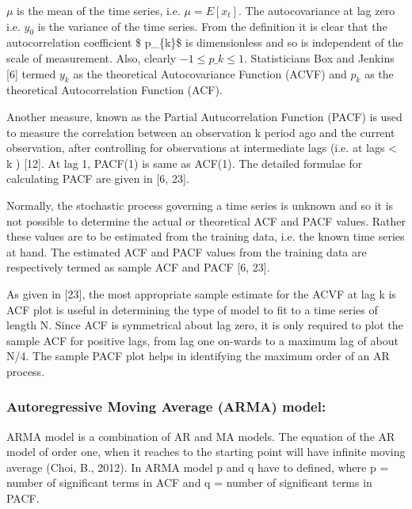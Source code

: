 \documentclass[
  onepage,
  openany]{scrbook}
\begin{document}
\(\mu\) is the mean of the time series, i.e.
\(\mu = E\left[x_{t}\right]\). The autocovariance at lag zero i.e.
\(y_{0}\) is the variance of the time series. From the definition it is
clear that the autocorrelation coefficient \$ p\_\{k\}\$ is
dimensionless and so is independent of the scale of measurement. Also,
clearly \(-1 \leq p\_{k}\leq 1\). Statisticians Box and Jenkins {[}6{]}
termed \(y_{k }\) as the theoretical Autocovariance Function (ACVF) and
\(p_{k}\) as the theoretical Autocorrelation Function (ACF).

Another measure, known as the Partial Autucorrelation Function (PACF) is
used to measure the correlation between an observation k period ago and
the current observation, after controlling for observations at
intermediate lags (i.e. at lags \textless{} k ) {[}12{]}. At lag 1,
PACF(1) is same as ACF(1). The detailed formulae for calculating PACF
are given in {[}6, 23{]}.

Normally, the stochastic process governing a time series is unknown and
so it is not possible to determine the actual or theoretical ACF and
PACF values. Rather these values are to be estimated from the training
data, i.e. the known time series at hand. The estimated ACF and PACF
values from the training data are respectively termed as sample ACF and
PACF {[}6, 23{]}.

As given in {[}23{]}, the most appropriate sample estimate for the ACVF
at lag k is ACF plot is useful in determining the type of model to fit
to a time series of length N. Since ACF is symmetrical about lag zero,
it is only required to plot the sample ACF for positive lags, from lag
one on-wards to a maximum lag of about N/4. The sample PACF plot helps
in identifying the maximum order of an AR process.

\hypertarget{autoregressive-moving-average-arma-model}{%
\subsubsection{\texorpdfstring{\textbf{Autoregressive Moving Average
(ARMA)
model:}}{Autoregressive Moving Average (ARMA) model:}}\label{autoregressive-moving-average-arma-model}}

ARMA model is a combination of AR and MA models. The equation of the AR
model of order one, when it reaches to the starting point will have
infinite moving average (Choi, B., 2012). In ARMA model p and q have to
defined, where p = number of significant terms in ACF and q = number of
significant terms in PACF.
\end{document}
